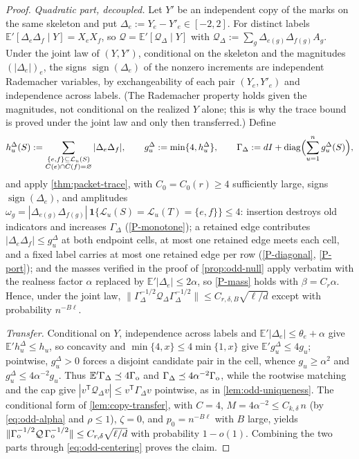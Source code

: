 \documentclass[11pt]{article}
\theoremstyle{definition}
\theoremstyle{remark}
\newcommand{\E}{\mathbb E}
\newcommand{\1}{\mathbf 1}
\newcommand{\cL}{\mathcal L}
\newcommand{\cQ}{\mathcal Q}
\DeclareMathOperator{\diag}{diag}
\DeclareMathOperator{\sign}{sign}
\numberwithin{equation}{section}
\begin{document}
\begin{proof}
\emph{Quadratic part, decoupled.}  Let $Y'$ be an independent copy of
the marks on the same skeleton and put $\Delta_e:=Y_e-Y'_e\in[-2,2]$.
For distinct labels $\E'[\Delta_e\Delta_f\mid Y]=X_eX_f$, so
$\cQ=\E'[\cQ_\Delta\mid Y]$ with
$\cQ_\Delta:=\sum_g\Delta_{e(g)}\Delta_{f(g)}A_g$.  Under the joint law
of $(Y,Y')$, conditional on the skeleton and the magnitudes
$(|\Delta_e|)_e$, the signs $\sign(\Delta_e)$ of the nonzero increments
are independent Rademacher variables, by exchangeability of each pair
$(Y_e,Y'_e)$ and independence across labels.  (The Rademacher property
holds given the magnitudes, not conditional on the realized $Y$ alone;
this is why the trace bound is proved under the joint law and only then
transferred.)  Define
\[
 h_u^\Delta(S):=\sum_{\substack{\{e,f\}\subseteq\cL_u(S)\\
 C(e)\cap C(f)=\varnothing}}|\Delta_e\Delta_f|,
 \qquad
 g_u^\Delta:=\min\{4,h_u^\Delta\},
 \qquad
 \Gamma_\Delta:=dI+\diag\Bigl(\sum_{u=1}^ng_u^\Delta(S)\Bigr),
\]
and apply \cref{thm:packet-trace}, with $C_0=C_0(r)\ge4$ sufficiently
large, signs $\sign(\Delta_e)$, and amplitudes
$\omega_g=|\Delta_{e(g)}\Delta_{f(g)}|\,
\1\{\cL_u(S)=\cL_u(T)=\{e,f\}\}\le4$: insertion destroys old
indicators and increases $\Gamma_\Delta$ (\ref{P-monotone}); a retained
edge contributes $|\Delta_e\Delta_f|\le g_u^\Delta$ at both endpoint
cells, at most one retained edge meets each cell, and a fixed label
carries at most one retained edge per row (\ref{P-diagonal},
\ref{P-port}); and the masses verified in the proof of
\cref{prop:odd-null} apply verbatim with the realness factor $\alpha$
replaced by $\E'|\Delta_e|\le2\alpha$, so \ref{P-mass} holds with
$\beta=C_r\alpha$.  Hence, under the joint law,
$\|\Gamma_\Delta^{-1/2}\cQ_\Delta\Gamma_\Delta^{-1/2}\|
\le C_{r,\delta,B}\sqrt{\ell/d}$ except with probability $n^{-B\ell}$.

\emph{Transfer.}  Conditional on $Y$, independence across labels and
$\E'|\Delta_e|\le\theta_e+\alpha$ give $\E'h_u^\Delta\le h_u$, so
concavity and $\min\{4,x\}\le4\min\{1,x\}$ give
$\E'g_u^\Delta\le4g_u$; pointwise, $g_u^\Delta>0$ forces a disjoint
candidate pair in the cell, whence $g_u\ge\alpha^2$ and
$g_u^\Delta\le4\alpha^{-2}g_u$.  Thus
$\E'\Gamma_\Delta\preceq4\Gamma_{\rm o}$ and
$\Gamma_\Delta\preceq4\alpha^{-2}\Gamma_{\rm o}$, while the rootwise
matching and the cap give
$|v^{\mathsf T}\cQ_\Delta v|\le v^{\mathsf T}\Gamma_\Delta v$
pointwise, as in \cref{lem:odd-uniqueness}.  The conditional form of
\cref{lem:copy-transfer}, with $C=4$,
$M=4\alpha^{-2}\le C_{k,\delta}\,n$ (by \cref{eq:odd-alpha} and
$\rho\le1$), $\zeta=0$, and $p_0=n^{-B\ell}$ with $B$ large, yields
$\|\Gamma_{\rm o}^{-1/2}\cQ\,\Gamma_{\rm o}^{-1/2}\|
\le C_{r,\delta}\sqrt{\ell/d}$ with probability $1-o(1)$.  Combining
the two parts through \cref{eq:odd-centering} proves the claim.
\end{proof}
\end{document}

